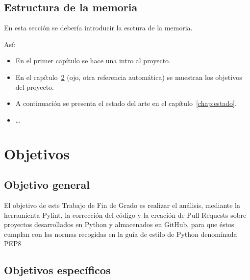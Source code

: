 \documentclass[a4paper, 12pt]{book}
\begin{document}
\section{Estructura de la memoria}
\label{sec:estructura}

En esta sección se debería introducir la esctura de la memoria. 

Así:

\begin{itemize}
  \item En el primer capítulo se hace una intro al proyecto.
  
  \item En el capítulo~\ref{chap:objetivos} (ojo, otra referencia automática) se muestran los objetivos del proyecto.
  
  \item A continuación se presenta el estado del arte en el capítulo~\ref{chap:estado}.
  
  \item \ldots
\end{itemize}




\cleardoublepage %
\chapter{Objetivos} %
\label{chap:objetivos} %

\section{Objetivo general} %
\label{sec:objetivo-general} %

El objetivo de este Trabajo de Fin de Grado es realizar el análisis, mediante la herramienta Pylint, la corrección del código y la creación de Pull-Requests sobre proyectos desarrollados en Python y almacenados en GitHub, para que éstos cumplan con las normas recogidas en la guía de estilo de Python denominada PEP8

\section{Objetivos específicos}
\label{sec:objetivos-especificos}
\end{document}

